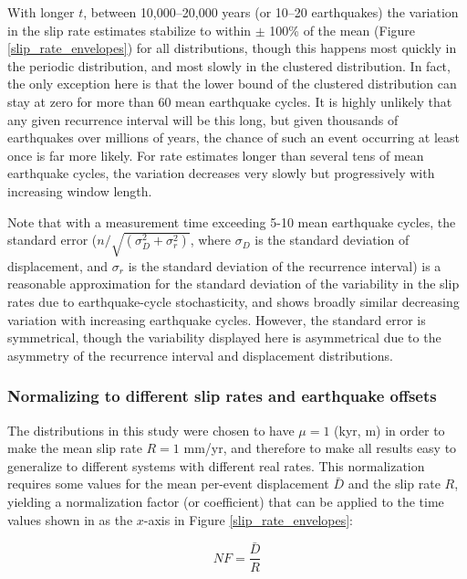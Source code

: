 \documentclass[se, manuscript]{copernicus}
\begin{document}
With longer \(t\), between 10,000--20,000 years (or 10--20 earthquakes)
the variation in the slip rate estimates stabilize to within \(\pm\)
100\% of the mean (Figure \ref{slip_rate_envelopes}) for all
distributions, though this happens most quickly in the periodic
distribution, and most slowly in the clustered distribution. In fact,
the only exception here is that the lower bound of the clustered
distribution can stay at zero for more than 60 mean earthquake cycles. It is
highly unlikely that any given recurrence interval will be this long, but
given thousands of earthquakes over millions of years, the chance of such an
event occurring at least once is far more likely. For rate estimates longer
than several tens of mean earthquake cycles, the variation decreases very
slowly but progressively with increasing window length.

Note that with a measurement time exceeding 5-10 mean earthquake cycles, the
standard error ($n / \sqrt{(\sigma_D^2 + \sigma_r^2)}$, where $\sigma_D$ is
the standard deviation of displacement, and $\sigma_r$ is the standard
deviation of the recurrence interval) is a reasonable approximation for the
standard deviation of the variability in the slip rates due to
earthquake-cycle stochasticity, and shows broadly similar decreasing
variation with increasing earthquake cycles. However, the standard error is
symmetrical, though the variability displayed here is asymmetrical due to the
asymmetry of the recurrence interval and displacement distributions.

\subsubsection{Normalizing to different slip rates and earthquake
offsets}\label{normalizing-to-different-slip-rates-and-earthquake-offsets}

The distributions in this study were chosen to have \(\mu=1\) (kyr, m)
in order to make the mean slip rate \(R=1\) mm/yr, and therefore to make
all results easy to generalize to different systems with different real
rates. This normalization requires some values for the mean per-event
displacement \(\bar{D}\) and the slip rate \(R\), yielding a
normalization factor (or coefficient) that can be applied to the time
values shown in as the \(x\)-axis in Figure \ref{slip_rate_envelopes}:

\begin{equation}
  NF = \frac{\bar{D}}{R}
  \label{norm_eqn}
\end{equation}
\end{document}
